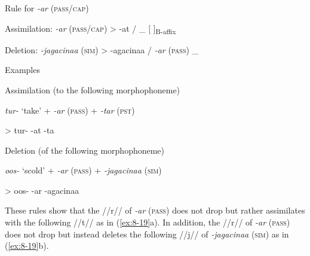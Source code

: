 \ea\label{ex:8-18}
  Rule for \textit{-ar} (\textsc{pass}/\textsc{cap})

\ea Assimilation:  \textit{-ar} (\textsc{pass}/\textsc{cap})  >  -at  /  \_  [  ]\textsubscript{B-affix}


\ex Deletion:  \textit{-jagacinaa} (\textsc{sim})  >  -agacinaa  /  \textit{-ar} (\textsc{pass})  \_
\z
\z

\ea\label{ex:8-19}
  Examples

\ea Assimilation (to the following morphophoneme)

      \textit{tur-}  ‘take’  +  \textit{-ar} (\textsc{pass})  +  \textit{-tar} (\textsc{pst})

    >  tur-      -at      -ta


\ex Deletion (of the following morphophoneme)

      \textit{oos-}  ‘scold’  +  \textit{-ar} (\textsc{pass})  +  \textit{-jagacinaa} (\textsc{sim})

    >  oos-      -ar      -agacinaa
\z
\z

These rules show that the //r// of \textit{-ar} (\textsc{pass}) does not drop but rather assimilates with the following //t// as in (\ref{ex:8-19}a). In addition, the //r// of \textit{-ar} (\textsc{pass}) does not drop but instead deletes the following //j// of \textit{-jagacinaa} (\textsc{sim}) as in (\ref{ex:8-19}b).

